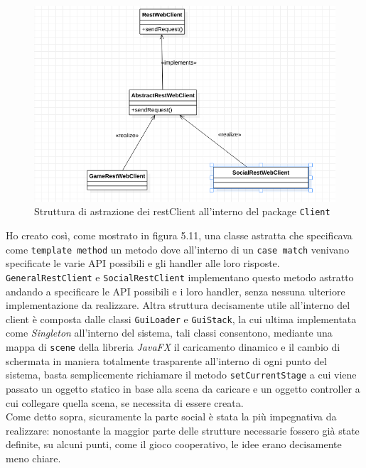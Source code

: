 \begin{figure}[H]
	\includegraphics[width=\textwidth,height=\textheight,keepaspectratio]{RestWebClient}
	\caption{Struttura di astrazione dei restClient all'interno del package \texttt{Client}}
\end{figure}

Ho creato così, come mostrato in figura 5.11, una classe astratta che specificava come \texttt{template method} un metodo dove all'interno di un \texttt{case match} venivano specificate le varie API possibili e gli handler alle loro risposte.
\texttt{GeneralRestClient} e \texttt{SocialRestClient} implementano questo metodo astratto andando a specificare le API possibili e i loro handler, senza nessuna ulteriore implementazione da realizzare.
Altra struttura decisamente utile all'interno del client è composta dalle classi \texttt{GuiLoader} e \texttt{GuiStack}, la cui ultima implementata come \textit{Singleton} all'interno del sistema, tali classi consentono, mediante una mappa di \texttt{scene} della libreria \textit{JavaFX} il caricamento dinamico e il cambio di schermata in maniera totalmente trasparente all'interno di ogni punto del sistema, basta semplicemente richiamare il metodo \texttt{setCurrentStage} a cui viene passato un oggetto statico in base alla scena da caricare e un oggetto controller a cui collegare quella scena, se necessita di essere creata.\\
Come detto sopra, sicuramente la parte social è stata la più impegnativa da realizzare: nonostante la maggior parte delle strutture necessarie fossero già state definite, su alcuni punti, come il gioco cooperativo, le idee erano decisamente meno chiare.\\

